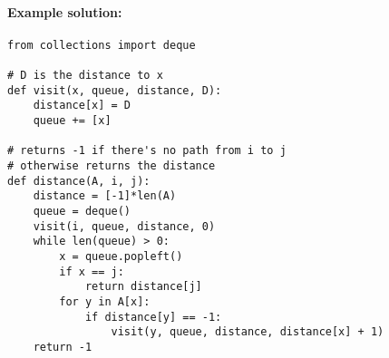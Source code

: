 \documentclass[11pt]{article}
\begin{document}
\paragraph{Example solution:}

\begin{verbatim}
from collections import deque

# D is the distance to x
def visit(x, queue, distance, D):
    distance[x] = D
    queue += [x]

# returns -1 if there's no path from i to j
# otherwise returns the distance
def distance(A, i, j):
    distance = [-1]*len(A)
    queue = deque()
    visit(i, queue, distance, 0)
    while len(queue) > 0:
        x = queue.popleft()
        if x == j:
            return distance[j]
        for y in A[x]:
            if distance[y] == -1:
                visit(y, queue, distance, distance[x] + 1)
    return -1
\end{verbatim}
\end{document}
